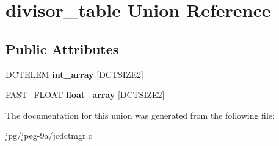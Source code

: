 \hypertarget{uniondivisor__table}{\section{divisor\+\_\+table Union Reference}
\label{uniondivisor__table}
}
\subsection*{Public Attributes}
\begin{DoxyCompactItemize}
\item 
\hypertarget{uniondivisor__table_a57e8528abf46b37f84205e45bfd86902}{D\+C\+T\+E\+L\+E\+M {\bfseries int\+\_\+array} \mbox{[}D\+C\+T\+S\+I\+Z\+E2\mbox{]}}\label{uniondivisor__table_a57e8528abf46b37f84205e45bfd86902}

\item 
\hypertarget{uniondivisor__table_aab561bc3498ee69f4177e4a1b17d015a}{F\+A\+S\+T\+\_\+\+F\+L\+O\+A\+T {\bfseries float\+\_\+array} \mbox{[}D\+C\+T\+S\+I\+Z\+E2\mbox{]}}\label{uniondivisor__table_aab561bc3498ee69f4177e4a1b17d015a}

\end{DoxyCompactItemize}


The documentation for this union was generated from the following file\+:\begin{DoxyCompactItemize}
\item 
jpg/jpeg-\/9a/jcdctmgr.\+c\end{DoxyCompactItemize}
